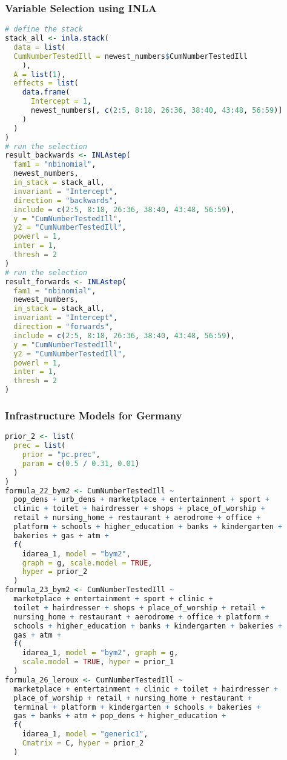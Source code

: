 \subsubsection{Variable Selection using INLA}
\begin{lstlisting}[caption={The code for variable selection in INLA.}, label={codeSelection}, language=R]
# define the stack
stack_all <- inla.stack(
  data = list(
  CumNumberTestedIll = newest_numbers$CumNumberTestedIll
    ),
  A = list(1),
  effects = list(
    data.frame(
      Intercept = 1,
      newest_numbers[, c(2:5, 8:18, 26:36, 38:40, 43:48, 56:59)]
    )
  )
)
# run the selection
result_backwards <- INLAstep(
  fam1 = "nbinomial",
  newest_numbers,
  in_stack = stack_all,
  invariant = "Intercept",
  direction = "backwards",
  include = c(2:5, 8:18, 26:36, 38:40, 43:48, 56:59),
  y = "CumNumberTestedIll",
  y2 = "CumNumberTestedIll",
  powerl = 1,
  inter = 1,
  thresh = 2
)
# run the selection
result_forwards <- INLAstep(
  fam1 = "nbinomial",
  newest_numbers,
  in_stack = stack_all,
  invariant = "Intercept",
  direction = "forwards",
  include = c(2:5, 8:18, 26:36, 38:40, 43:48, 56:59),
  y = "CumNumberTestedIll",
  y2 = "CumNumberTestedIll",
  powerl = 1,
  inter = 1,
  thresh = 2
)
\end{lstlisting}
\subsubsection{Infrastructure Models for Germany}
\begin{lstlisting}[caption={The code for the demographic models.}, label={infraGermanyCode}, language=R]
prior_2 <- list(
  prec = list(
    prior = "pc.prec",
    param = c(0.5 / 0.31, 0.01)
  )
)
formula_22_bym2 <- CumNumberTestedIll ~
  pop_dens + urb_dens + marketplace + entertainment + sport +
  clinic + toilet + hairdresser + shops + place_of_worship +
  retail + nursing_home + restaurant + aerodrome + office +
  platform + schools + higher_education + banks + kindergarten +
  bakeries + gas + atm +
  f(
    idarea_1, model = "bym2",
    graph = g, scale.model = TRUE,
    hyper = prior_2
  ) 
formula_23_bym2 <- CumNumberTestedIll ~
  marketplace + entertainment + sport + clinic +
  toilet + hairdresser + shops + place_of_worship + retail +
  nursing_home + restaurant + aerodrome + office + platform +
  schools + higher_education + banks + kindergarten + bakeries +
  gas + atm +
  f(
    idarea_1, model = "bym2", graph = g,
    scale.model = TRUE, hyper = prior_1
  ) 
formula_26_leroux <- CumNumberTestedIll ~
  marketplace + entertainment + clinic + toilet + hairdresser +
  place_of_worship + retail + nursing_home + restaurant +
  terminal + platform + kindergarten + schools + bakeries +
  gas + banks + atm + pop_dens + higher_education +
  f(
    idarea_1, model = "generic1",
    Cmatrix = C, hyper = prior_2
  )
\end{lstlisting}